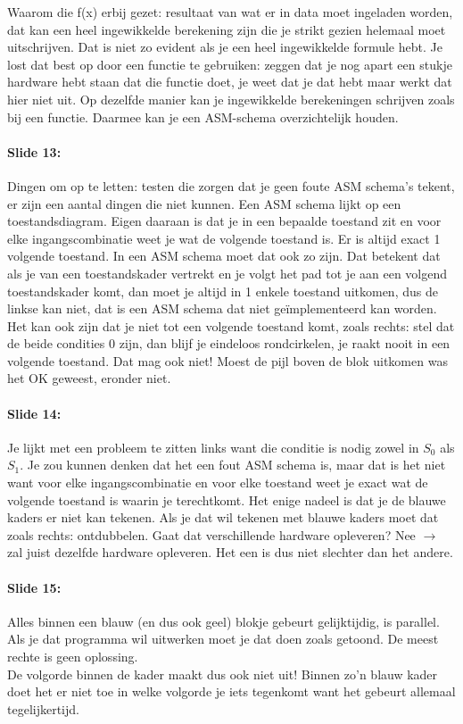 \documentclass[10pt,a4paper]{book}
\begin{document}
Waarom die f(x) erbij gezet: resultaat van wat er in data moet ingeladen worden, dat kan een heel ingewikkelde berekening zijn die je strikt gezien helemaal moet uitschrijven. Dat is niet zo evident als je een heel ingewikkelde  formule hebt. Je lost dat best op door een functie te gebruiken: zeggen dat je nog apart een stukje hardware hebt staan dat die functie doet, je weet dat je dat hebt maar werkt dat hier niet uit. Op dezelfde manier kan je ingewikkelde berekeningen schrijven zoals bij een functie. Daarmee kan je een ASM-schema overzichtelijk houden.

\paragraph{Slide 13:} Dingen om op te letten: testen die zorgen dat je geen foute ASM schema's tekent, er zijn een aantal dingen die niet kunnen. Een ASM schema lijkt op een toestandsdiagram. Eigen daaraan is dat je in een bepaalde toestand zit en voor elke ingangscombinatie weet je wat de volgende toestand is. Er is altijd exact 1 volgende toestand. In een ASM schema moet dat ook zo zijn. Dat betekent dat als je van een toestandskader vertrekt en je volgt het pad tot je aan een volgend toestandskader komt, dan moet je altijd in 1 enkele toestand uitkomen, dus de linkse kan niet, dat is een ASM schema dat niet ge\"implementeerd kan worden. Het kan ook zijn dat je niet tot een volgende toestand komt, zoals rechts: stel dat de beide condities 0 zijn, dan blijf je eindeloos rondcirkelen, je raakt nooit in een volgende toestand. Dat mag ook niet! Moest de pijl boven de blok uitkomen was het OK geweest, eronder niet.

\paragraph{Slide 14:} Je lijkt met een probleem te zitten links want die conditie is nodig zowel in $S_0$ als $S_1$. Je zou kunnen denken dat het een fout ASM schema is, maar dat is het niet want voor elke ingangscombinatie en voor elke toestand weet je exact wat de volgende toestand is waarin je terechtkomt. Het enige nadeel is dat je de blauwe kaders er niet kan tekenen. Als je dat wil tekenen met blauwe kaders moet dat zoals rechts: ontdubbelen. Gaat dat verschillende hardware opleveren? Nee $\rightarrow$ zal juist dezelfde hardware opleveren. Het een is dus niet slechter dan het andere.

\paragraph{Slide 15:} Alles binnen een blauw (en dus ook geel) blokje gebeurt gelijktijdig, is parallel. Als je dat programma wil uitwerken moet je dat doen zoals getoond. De meest rechte is geen oplossing.\\
De volgorde binnen de kader maakt dus ook niet uit! Binnen zo'n blauw kader doet het er niet toe in welke volgorde je iets tegenkomt want het gebeurt allemaal tegelijkertijd.
\end{document}
